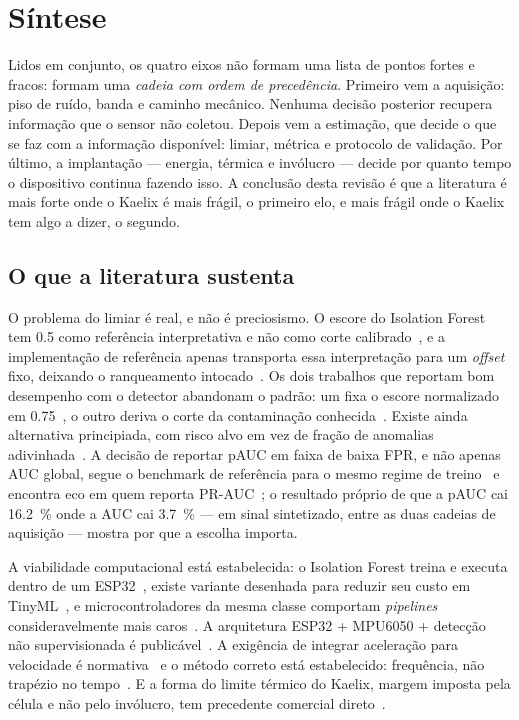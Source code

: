 \documentclass[11pt,a4paper]{article}
\begin{document}
\section{Síntese}

Lidos em conjunto, os quatro eixos não formam uma lista de pontos fortes e fracos: formam
uma \emph{cadeia com ordem de precedência}. Primeiro vem a aquisição: piso de ruído, banda
e caminho mecânico. Nenhuma decisão posterior recupera informação que o sensor não
coletou. Depois vem a estimação, que decide o que se faz com a informação disponível:
limiar, métrica e protocolo de validação. Por último, a implantação --- energia, térmica e
invólucro --- decide por quanto tempo o dispositivo continua fazendo isso. A conclusão
desta revisão é que a literatura é mais forte onde o Kaelix é mais frágil, o primeiro elo,
e mais frágil onde o Kaelix tem algo a dizer, o segundo.

\subsection{O que a literatura sustenta}

O problema do limiar é real, e não é preciosismo. O escore do Isolation Forest tem
\num{0,5} como referência interpretativa e não como corte calibrado~\cite{liu2008}, e a
implementação de referência apenas transporta essa interpretação para um \emph{offset}
fixo, deixando o ranqueamento intocado~\cite{scikitlearn2026}. Os dois trabalhos que
reportam bom desempenho com o detector abandonam o padrão: um fixa o escore normalizado
em \num{0,75}~\cite{antonini2023}, o outro deriva o corte da contaminação
conhecida~\cite{brito2022}. Existe ainda alternativa principiada, com risco alvo em vez de
fração de anomalias adivinhada~\cite{siffer2017}. A decisão de reportar pAUC em faixa de
baixa FPR, e não apenas AUC global, segue o benchmark de referência para o mesmo regime de
treino~\cite{koizumi2020} e encontra eco em quem reporta PR-AUC~\cite{brito2022}; o
resultado próprio de que a pAUC cai \SI{16,2}{\percent} onde a AUC cai \SI{3,7}{\percent}
--- em sinal sintetizado, entre as duas cadeias de aquisição --- mostra por que a escolha
importa.

A viabilidade computacional está estabelecida: o Isolation Forest treina e executa dentro
de um ESP32~\cite{antonini2023}, existe variante desenhada para reduzir seu custo em
TinyML~\cite{barbariol2022}, e microcontroladores da mesma classe comportam
\emph{pipelines} consideravelmente mais caros~\cite{uselis2025,kumar2026}. A arquitetura
ESP32 + MPU6050 + detecção não supervisionada é publicável~\cite{kolok2025}. A exigência
de integrar aceleração para velocidade é normativa~\cite{iso208163_2022} e o método
correto está estabelecido: frequência, não trapézio no tempo~\cite{brandt2014}. E a forma
do limite térmico do Kaelix, margem imposta pela célula e não pelo invólucro, tem
precedente comercial direto~\cite{bentlynevada2025}.
\end{document}
